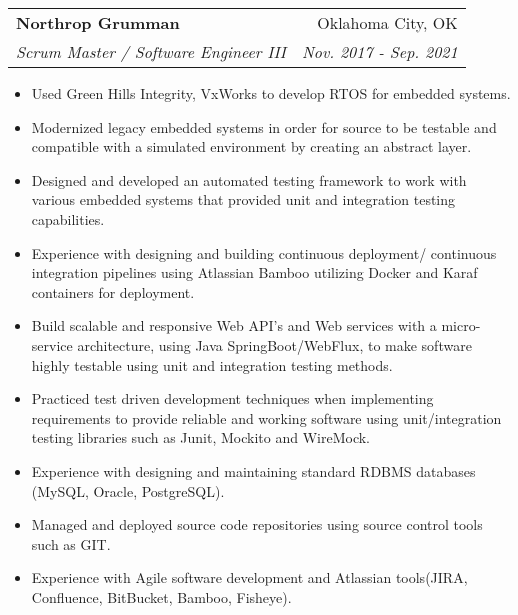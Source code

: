 \documentclass[letterpaper,11pt]{article}
\makeatletter
\newcommand{\resumeItem}[2]{
  \item\small{
    \textbf{#1}{#2 \vspace{-2pt}}
  }
}
\newcommand{\resumeSubheading}[4]{
  \vspace{-1pt}\item
    \begin{tabular*}{0.97\textwidth}[t]{l@{\extracolsep{\fill}}r}
      \textbf{#1} & #2 \\
      \textit{\small#3} & \textit{\small #4} \\
    \end{tabular*}\vspace{-5pt}
}
\newcommand{\resumeItemListStart}{\begin{itemize}}
\newcommand{\resumeItemListEnd}{\end{itemize}\vspace{-5pt}}
\makeatother
\begin{document}
    \resumeSubheading
      {Northrop Grumman}{Oklahoma City, OK}
      {Scrum Master / Software Engineer III}{Nov. 2017 - Sep. 2021}
      \resumeItemListStart
        \resumeItem{}
          {Used Green Hills Integrity, VxWorks to develop RTOS for embedded systems.}
        \resumeItem{}
          {Modernized legacy embedded systems in order for source to be testable and compatible with a simulated environment by creating an abstract layer.}
        \resumeItem{}
          {Designed and developed an automated testing framework to work with various embedded systems that provided unit and integration testing capabilities.}
        \resumeItem{}
          {Experience with designing and building continuous deployment/ continuous integration pipelines using Atlassian Bamboo utilizing Docker and Karaf containers for deployment.}
        \resumeItem{}
          {Build scalable and responsive Web API's and Web services with a micro-service architecture, using Java SpringBoot/WebFlux, to make software highly testable using unit and integration testing methods.}
        \resumeItem{}
          {Practiced test driven development techniques when implementing requirements to provide reliable and working software using unit/integration testing libraries such as Junit, Mockito and WireMock.}
        \resumeItem{}
          {Experience with designing and maintaining standard RDBMS databases (MySQL, Oracle, PostgreSQL).}
        \resumeItem{}
          {Managed and deployed source code repositories using source control tools such as GIT.}
        \resumeItem{}
          {Experience with Agile software development and Atlassian tools(JIRA, Confluence, BitBucket, Bamboo, Fisheye).}
      \resumeItemListEnd
\end{document}
